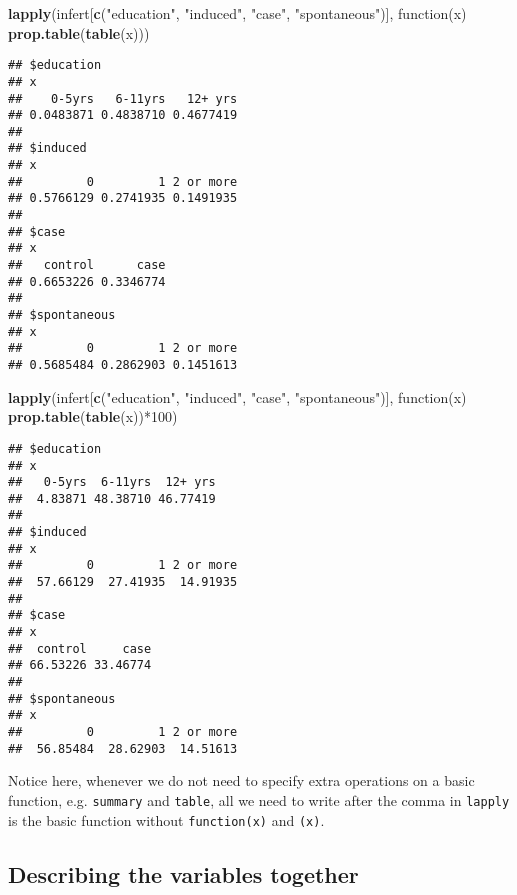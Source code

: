 \documentclass[]{book}
\newenvironment{Shaded}{\begin{snugshade}}{\end{snugshade}}
\newcommand{\KeywordTok}[1]{\textcolor[rgb]{0.13,0.29,0.53}{\textbf{{#1}}}}
\newcommand{\DecValTok}[1]{\textcolor[rgb]{0.00,0.00,0.81}{{#1}}}
\newcommand{\StringTok}[1]{\textcolor[rgb]{0.31,0.60,0.02}{{#1}}}
\newcommand{\NormalTok}[1]{{#1}}
\theoremstyle{definition}
\theoremstyle{definition}
\theoremstyle{remark}
\begin{document}
\begin{Shaded}
\begin{Highlighting}[]
\KeywordTok{lapply}\NormalTok{(infert[}\KeywordTok{c}\NormalTok{(}\StringTok{"education"}\NormalTok{, }\StringTok{"induced"}\NormalTok{, }\StringTok{"case"}\NormalTok{, }\StringTok{"spontaneous"}\NormalTok{)], }
       \NormalTok{function(x) }\KeywordTok{prop.table}\NormalTok{(}\KeywordTok{table}\NormalTok{(x)))}
\end{Highlighting}
\end{Shaded}

\begin{verbatim}
## $education
## x
##    0-5yrs   6-11yrs   12+ yrs 
## 0.0483871 0.4838710 0.4677419 
## 
## $induced
## x
##         0         1 2 or more 
## 0.5766129 0.2741935 0.1491935 
## 
## $case
## x
##   control      case 
## 0.6653226 0.3346774 
## 
## $spontaneous
## x
##         0         1 2 or more 
## 0.5685484 0.2862903 0.1451613
\end{verbatim}

\begin{Shaded}
\begin{Highlighting}[]
\KeywordTok{lapply}\NormalTok{(infert[}\KeywordTok{c}\NormalTok{(}\StringTok{"education"}\NormalTok{, }\StringTok{"induced"}\NormalTok{, }\StringTok{"case"}\NormalTok{, }\StringTok{"spontaneous"}\NormalTok{)], }
       \NormalTok{function(x) }\KeywordTok{prop.table}\NormalTok{(}\KeywordTok{table}\NormalTok{(x))*}\DecValTok{100}\NormalTok{)}
\end{Highlighting}
\end{Shaded}

\begin{verbatim}
## $education
## x
##   0-5yrs  6-11yrs  12+ yrs 
##  4.83871 48.38710 46.77419 
## 
## $induced
## x
##         0         1 2 or more 
##  57.66129  27.41935  14.91935 
## 
## $case
## x
##  control     case 
## 66.53226 33.46774 
## 
## $spontaneous
## x
##         0         1 2 or more 
##  56.85484  28.62903  14.51613
\end{verbatim}

Notice here, whenever we do not need to specify extra operations on a
basic function, e.g. \texttt{summary} and \texttt{table}, all we need to
write after the comma in \texttt{lapply} is the basic function without
\texttt{function(x)} and \texttt{(x)}.

\subsection{Describing the variables
together}\label{describing-the-variables-together}
\end{document}
